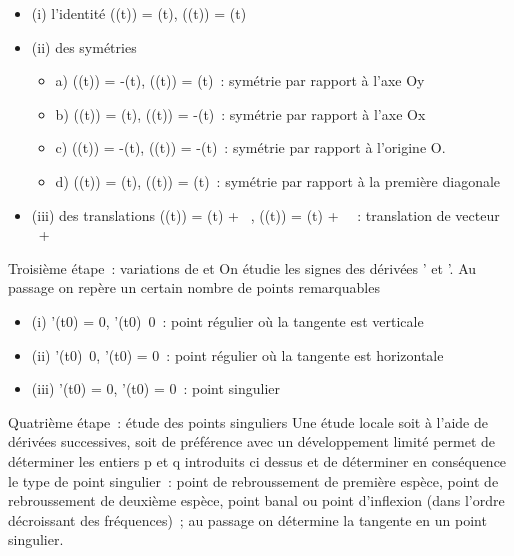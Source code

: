 \begin{itemize}
\itemsep1pt\parskip0pt
\item
  (i) l'identité \phi(\theta(t)) = \phi(t), \psi(\theta(t)) = \psi(t)
\item
  (ii) des symétries

  \begin{itemize}
  \itemsep1pt\parskip0pt
  \item
    a) \phi(\theta(t)) = -\phi(t), \psi(\theta(t)) = \psi(t)~: symétrie par rapport à l'axe Oy
  \item
    b) \phi(\theta(t)) = \phi(t), \psi(\theta(t)) = -\psi(t)~: symétrie par rapport à l'axe Ox
  \item
    c) \phi(\theta(t)) = -\phi(t), \psi(\theta(t)) = -\psi(t)~: symétrie par rapport à
    l'origine O.
  \item
    d) \phi(\theta(t)) = \psi(t), \psi(\theta(t)) = \phi(t)~: symétrie par rapport à la
    première diagonale
  \end{itemize}
\item
  (iii) des translations \phi(\theta(t)) = \phi(t) + \alpha~, \psi(\theta(t)) = \psi(t) + \beta~~:
  translation de vecteur \alpha~\vec\imath +
  \beta~
\end{itemize}

Troisième étape~: variations de \phi et \psi On étudie les signes des dérivées
\phi' et \psi'. Au passage on repère un certain nombre de points remarquables

\begin{itemize}
\itemsep1pt\parskip0pt
\item
  (i) \phi'(t0) = 0,
  \psi'(t0)\neq~0~: point régulier où la
  tangente est verticale
\item
  (ii) \phi'(t0)\neq~0, \psi'(t0) =
  0~: point régulier où la tangente est horizontale
\item
  (iii) \phi'(t0) = 0, \psi'(t0) = 0~: point singulier
\end{itemize}

Quatrième étape~: étude des points singuliers Une étude locale soit à
l'aide de dérivées successives, soit de préférence avec un développement
limité permet de déterminer les entiers p et q introduits ci dessus et
de déterminer en conséquence le type de point singulier~: point de
rebroussement de première espèce, point de rebroussement de deuxième
espèce, point banal ou point d'inflexion (dans l'ordre décroissant des
fréquences)~; au passage on détermine la tangente en un point singulier.

